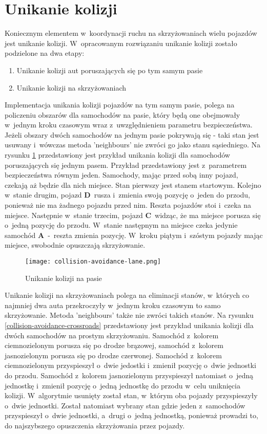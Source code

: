 \section{Unikanie kolizji}

Koniecznym elementem w~koordynacji ruchu na skrzyżowaniach wielu pojazdów jest unikanie kolizji. W~opracowanym rozwiązaniu unikanie kolizji zostało podzielone na dwa etapy:
\begin{enumerate}
\item Unikanie kolizji aut poruszających się po tym samym pasie
\item Unikanie kolizji na skrzyżowaniach
\end{enumerate}
Implementacja unikania kolizji pojazdów na tym samym pasie, polega na policzeniu obszarów dla samochodów na pasie, który będą one obejmowały w~jednym kroku czasowym wraz z~uwzględnieniem parametru bezpieczeństwa. Jeżeli obszary dwóch samochodów na jednym pasie pokrywają się - taki stan jest usuwany i~wówczas metoda 'neighbours' nie zwróci go jako stanu sąsiedniego. Na rysunku \ref{collision-avoidance-lane} przedstawiony jest przykład unikania kolizji dla samochodów poruszających się jednym pasem. Przykład przedstawiony jest z~parametrem bezpieczeństwa równym jeden. Samochody, mając przed sobą inny pojazd, czekają aż będzie dla nich miejsce. Stan pierwszy jest stanem startowym. Kolejno w~stanie drugim, pojazd \textbf{D}~rusza i~zmienia swoją pozycję o~jeden do przodu, ponieważ nie ma żadnego pojazdu przed nim. Reszta pojazdów stoi i~czeka na miejsce. Następnie w~stanie trzecim, pojazd \textbf{C}~widząc, że ma miejsce porusza się o~jedną pozycję do przodu. W~stanie następnym na miejsce czeka jedynie samochód \textbf{A}~-~reszta zmienia pozycję. W~kroku piątym i~szóstym pojazdy mając miejsce, swobodnie opuszczają skrzyżowanie.
\begin{figure}[H]
    \texttt{[image: collision-avoidance-lane.png]}
  \caption{Unikanie kolizji na pasie}
  \label{collision-avoidance-lane}
\end{figure}
\newpage
Unikanie kolizji na skrzyżowaniach polega na eliminacji stanów, w~których co najmniej dwa auta przekroczyły w~jednym kroku czasowym to samo skrzyżowanie. Metoda 'neighbours' także nie zwróci takich stanów. Na rysunku \ref{collision-avoidance-crossroads} przedstawiony jest przykład unikania kolizji dla dwóch samochodów na prostym skrzyżowaniu. Samochód z~kolorem ciemnozielonym porusza się po drodze brązowej, samochód z~kolorem jasnozielonym porusza się po drodze czerwonej. Samochód z~kolorem ciemnozielonym przyspieszył o~dwie jedostki i~zmienił pozycję o~dwie jednostki do przodu. Samochód z~kolorem jasnozielonym przyspieszył natomiast o~jedną jednostkę i~zmienił pozycję o~jedną jednostkę do przodu w~celu uniknięcia kolizji. W~algorytmie usunięty został stan, w~którym oba pojazdy przyspieszyły o~dwie jednostki. Został natomiast wybrany stan gdzie jeden z~samochodów przyspieszył o~dwie jednostki, a~drugi o~jedną jednostką, ponieważ prowadzi to, do najszybszego opuszczenia skrzyżowania przez pojazdy.
